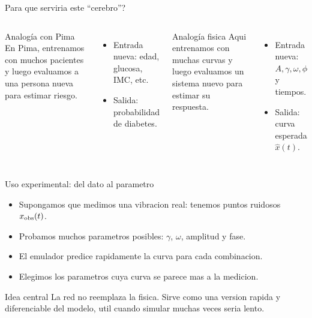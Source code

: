 \begin{frame}{Para que serviria este ``cerebro''?}
\begin{columns}[T,onlytextwidth]
\begin{block}{Analogía con Pima}
En Pima, entrenamos con muchos pacientes y luego evaluamos a una persona nueva para estimar riesgo.
\end{block}
\begin{itemize}
    \item Entrada nueva: edad, glucosa, IMC, etc.
    \item Salida: probabilidad de diabetes.
\end{itemize}

\begin{block}{Analogía fisica}
Aqui entrenamos con muchas curvas y luego evaluamos un sistema nuevo para estimar su respuesta.
\end{block}
\begin{itemize}
    \item Entrada nueva: $A,\gamma,\omega,\phi$ y tiempos.
    \item Salida: curva esperada $\hat{x}(t)$.
\end{itemize}
\end{columns}
\end{frame}

\begin{frame}{Uso experimental: del dato al parametro}
\begin{itemize}
    \item Supongamos que medimos una vibracion real: tenemos puntos ruidosos $x_{\rm obs}(t)$.
    \item Probamos muchos parametros posibles: $\gamma$, $\omega$, amplitud y fase.
    \item El emulador predice rapidamente la curva para cada combinacion.
    \item Elegimos los parametros cuya curva se parece mas a la medicion.
\end{itemize}
\begin{alertblock}{Idea central}
La red no reemplaza la fisica. Sirve como una version rapida y diferenciable del modelo, util cuando simular muchas veces seria lento.
\end{alertblock}
\end{frame}

